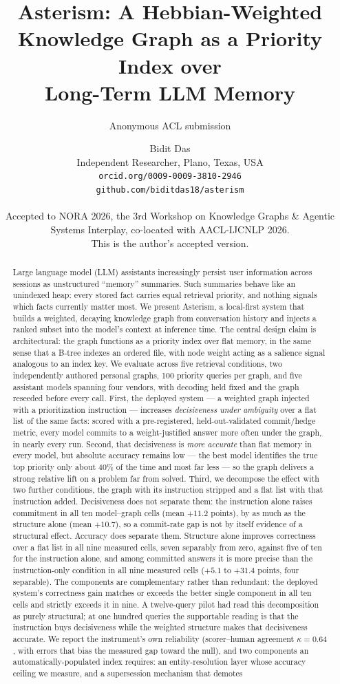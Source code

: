 \documentclass[11pt]{article}
\title{Asterism: A Hebbian-Weighted Knowledge Graph as a Priority Index over\\ Long-Term LLM Memory}
\author{Anonymous ACL submission}
\author{Bidit Das \\
    Independent Researcher, Plano, Texas, USA \\
    \texttt{orcid.org/0009-0009-3810-2946} \\
    \texttt{github.com/biditdas18/asterism} \\
    \ifssrn\parbox{0.72\textwidth}{\centering\normalfont\small
    Accepted to NORA 2026, the 3rd Workshop on Knowledge Graphs \& Agentic\\
    Systems Interplay, co-located with AACL-IJCNLP 2026.\\
    This is the author's accepted version.}\fi}
\begin{document}
\maketitle

\begin{abstract}
Large language model (LLM) assistants increasingly persist user information across sessions as unstructured ``memory'' summaries. Such summaries behave like an unindexed heap: every stored fact carries equal retrieval priority, and nothing signals which facts currently matter most. We present Asterism, a local-first system that builds a weighted, decaying knowledge graph from conversation history and injects a ranked subset into the model's context at inference time. The central design claim is architectural: the graph functions as a priority index over flat memory, in the same sense that a B-tree indexes an ordered file, with node weight acting as a salience signal analogous to an index key. We evaluate across five retrieval conditions, two independently authored personal graphs, 100 priority queries per graph, and five assistant models spanning four vendors, with decoding held fixed and the graph reseeded before every call. First, the deployed system --- a weighted graph injected with a prioritization instruction --- increases \emph{decisiveness under ambiguity} over a flat list of the same facts: scored with a pre-registered, held-out-validated commit/hedge metric, every model commits to a weight-justified answer more often under the graph, in nearly every run. Second, that decisiveness is \emph{more accurate} than flat memory in every model, but absolute accuracy remains low --- the best model identifies the true top priority only about 40\% of the time and most far less --- so the graph delivers a strong relative lift on a problem far from solved. Third, we decompose the effect with two further conditions, the graph with its instruction stripped and a flat list with that instruction added. Decisiveness does not separate them: the instruction alone raises commitment in all ten model--graph cells (mean $+11.2$ points), by as much as the structure alone (mean $+10.7$), so a commit-rate gap is not by itself evidence of a structural effect. Accuracy does separate them. Structure alone improves correctness over a flat list in all nine measured cells, seven separably from zero, against five of ten for the instruction alone, and among committed answers it is more precise than the instruction-only condition in all nine measured cells ($+5.1$ to $+31.4$ points, four separable). The components are complementary rather than redundant: the deployed system's correctness gain matches or exceeds the better single component in all ten cells and strictly exceeds it in nine. A twelve-query pilot had read this decomposition as purely structural; at one hundred queries the supportable reading is that the instruction buys decisiveness while the weighted structure makes that decisiveness accurate. We report the instrument's own reliability (scorer--human agreement $\kappa=0.64$, with errors that bias the measured gap toward the null), and two components an automatically-populated index requires: an entity-resolution layer whose accuracy ceiling we measure, and a supersession mechanism that demotes 
\end{abstract}
\end{document}
